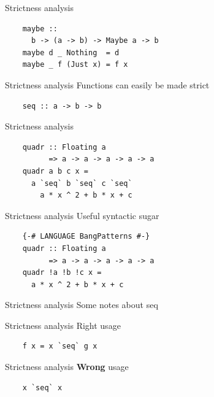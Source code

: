 \documentclass[20pt]{beamer}
\newcommand{\vspaced}{
    \vspace{5mm}
}
\begin{document}
\begin{frame}[fragile]{Strictness analysis}
    \begin{lstlisting}
    maybe ::
      b -> (a -> b) -> Maybe a -> b
    maybe d _ Nothing  = d
    maybe _ f (Just x) = f x
    \end{lstlisting}
\end{frame}

\begin{frame}[fragile]{Strictness analysis}
    Functions can easily be made strict \\
    \vspaced
    \begin{lstlisting}
    seq :: a -> b -> b
    \end{lstlisting}
\end{frame}

\begin{frame}[fragile]{Strictness analysis}
    \begin{lstlisting}
    quadr :: Floating a
          => a -> a -> a -> a -> a
    quadr a b c x =
      a `seq` b `seq` c `seq`
        a * x ^ 2 + b * x + c
    \end{lstlisting}
\end{frame}

\begin{frame}[fragile]{Strictness analysis}
    Useful syntactic sugar \\
    \vspaced
    \begin{lstlisting}
    {-# LANGUAGE BangPatterns #-}
    quadr :: Floating a
          => a -> a -> a -> a -> a
    quadr !a !b !c x =
      a * x ^ 2 + b * x + c
    \end{lstlisting}
\end{frame}

\begin{frame}{Strictness analysis}
    Some notes about seq
\end{frame}

\begin{frame}[fragile]{Strictness analysis}
    Right usage
    \vspaced
    \begin{lstlisting}
    f x = x `seq` g x
    \end{lstlisting}
\end{frame}

\begin{frame}[fragile]{Strictness analysis}
    \textbf{Wrong} usage
    \vspaced
    \begin{lstlisting}
    x `seq` x
    \end{lstlisting}
\end{frame}
\end{document}
